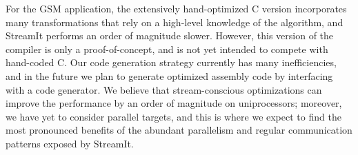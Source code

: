

For the GSM application, the extensively hand-optimized C version
incorporates many transformations that rely on a high-level knowledge
of the algorithm, and StreamIt performs an order of magnitude slower.
However, this version of the compiler is only a proof-of-concept, and
is not yet intended to compete with hand-coded C.  Our code generation
strategy currently has many inefficiencies, and in the future we plan
to generate optimized assembly code by interfacing with a code
generator.  We believe that stream-conscious optimizations can improve
the performance by an order of magnitude on uniprocessors; moreover,
we have yet to consider parallel targets, and this is where we expect
to find the most pronounced benefits of the abundant parallelism and
regular communication patterns exposed by StreamIt.
